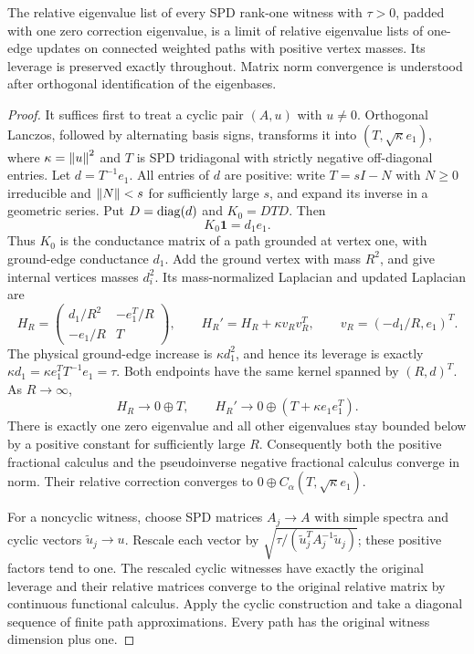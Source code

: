 \begin{lemma}\label{w:lem:masspath}
The relative eigenvalue list of every SPD rank-one witness with
$\tau>0$, padded with one zero correction eigenvalue, is a limit of
relative eigenvalue lists of one-edge updates on connected weighted
paths with positive vertex masses. Its leverage is preserved exactly
throughout. Matrix norm convergence is understood after orthogonal
identification of the eigenbases.
\end{lemma}
\begin{proof}
It suffices first to treat a cyclic pair $(A,u)$ with $u\ne0$.
Orthogonal Lanczos, followed by alternating basis signs, transforms it
into $(T,\sqrt\kappa e_1)$, where $\kappa=\left\lVert u\right\rVert^2$ and $T$ is SPD
tridiagonal with strictly negative off-diagonal entries.
Let $d=T^{-1}e_1$. All entries of $d$ are positive: write
$T=sI-N$ with $N\ge0$ irreducible and $\left\lVert N\right\rVert<s$ for sufficiently
large $s$, and expand its inverse in a geometric series. Put
$D=\operatorname{diag}(d)$ and $K_0=DTD$. Then
\[
 K_0\mathbf1=d_1e_1.
\]
Thus $K_0$ is the conductance matrix of a path grounded at vertex one,
with ground-edge conductance $d_1$. Add the ground vertex with mass
$R^2$, and give internal vertices masses $d_i^2$. Its mass-normalized
Laplacian and updated Laplacian are
\[
 H_R=\begin{pmatrix}d_1/R^2&-e_1^T/R\\-e_1/R&T\end{pmatrix},
 \qquad H_R'=H_R+\kappa v_Rv_R^T,
 \qquad v_R=(-d_1/R,e_1)^T.
\]
The physical ground-edge increase is $\kappa d_1^2$, and hence its
leverage is exactly $\kappa d_1=\kappa e_1^TT^{-1}e_1=\tau$.
Both endpoints have the same kernel spanned by $(R,d)^T$.
As $R\to\infty$,
\[
 H_R\to0\oplus T,\qquad
 H_R'\to0\oplus(T+\kappa e_1e_1^T).
\]
There is exactly one zero eigenvalue and all other eigenvalues stay
bounded below by a positive constant for sufficiently large $R$.
Consequently both the positive fractional calculus and the
pseudoinverse negative fractional calculus converge in norm. Their
relative correction converges to $0\oplus C_\alpha(T,\sqrt\kappa e_1)$.

For a noncyclic witness, choose SPD matrices $A_j\to A$ with simple
spectra and cyclic vectors $\widetilde u_j\to u$. Rescale each vector
by $\sqrt{\tau/(\widetilde u_j^TA_j^{-1}\widetilde u_j)}$; these
positive factors tend to one. The rescaled cyclic witnesses have
exactly the original leverage and their relative matrices converge to
the original relative matrix by continuous functional calculus.
Apply the cyclic construction and take a diagonal sequence of finite
path approximations. Every path has the original witness dimension
plus one.
\end{proof}

